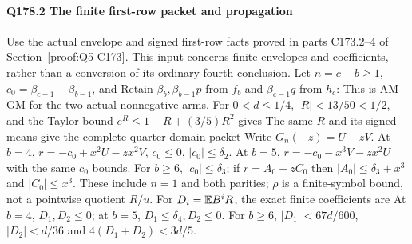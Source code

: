 \paragraph{Q178.2 The finite first-row packet and propagation}\label{part:Q178.2}
Use the actual envelope and signed first-row facts proved in parts C173.2--4
of Section~\ref{proof:Q5-C173}. This input concerns finite envelopes and
coefficients, rather than a conversion of its ordinary-fourth conclusion.
Let $n=\allowbreak c-b\ge\allowbreak 1$, $c_0=\allowbreak \beta_{c-1}-\beta_{b-1}$, and
Retain $\beta_b,\allowbreak \beta_{b-1}p$ from $f_b$ and $\beta_{c-1}q$ from $h_c$:
This is AM--GM for the two actual nonnegative arms.
For $0<\allowbreak d\le\allowbreak 1/4$, $|R|<\allowbreak 13/50<\allowbreak 1/2$, and the Taylor bound
$e^R\le\allowbreak 1+R+(3/5)R^2$ gives
The same $R$ and its signed means give the complete quarter-domain packet
Write $G_n(-z)=\allowbreak U-zV$. At $b=\allowbreak 4$,
$r=\allowbreak -c_0+x^2U-zx^2V$, $c_0\le\allowbreak 0$, $|c_0|\le\allowbreak \delta_2$.
At $b=\allowbreak 5$, $r=\allowbreak -c_0-x^3V-zx^2U$ with the same $c_0$ bounds.
For $b\ge\allowbreak 6$, $|c_0|\le\allowbreak \delta_3$; if $r=\allowbreak A_0+zC_0$ then
$|A_0|\le\allowbreak \delta_3+x^3$ and $|C_0|\le\allowbreak  x^3$.
These include $n=\allowbreak 1$ and both parities; $\rho$ is a finite-symbol bound,
not a pointwise quotient $R/u$.
For $D_i=\allowbreak \mathbb E B^iR$, the exact finite coefficients are
At $b=\allowbreak 4$, $D_1,\allowbreak D_2\le\allowbreak 0$; at $b=\allowbreak 5$, $D_1\le\allowbreak \delta_4,\allowbreak D_2\le\allowbreak 0$.
For $b\ge\allowbreak 6$, $|D_1|<\allowbreak 67d/600$, $|D_2|<\allowbreak d/36$ and
$4(D_1+D_2)<\allowbreak 3d/5$.
